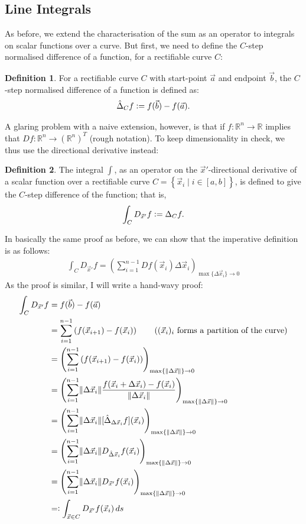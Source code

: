 \documentclass{article}
\newcommand{\vc}{\vcentcolon}
\theoremstyle{definition}
\newtheorem{defn}{Definition}[subsubsection]
\begin{document}
\subsection{Line Integrals}
As before, we extend the characterisation of the sum as an operator to integrals on scalar functions over a curve. But first, we need to define the $C$-step normalised difference of a function, for a rectifiable curve $C$:
\begin{defn}
	For a rectifiable curve $C$ with start-point $\vec a$ and endpoint $\vec b$, the $C$-step normalised difference of a function is defined as:
	\begin{align*}
		\hat{\Delta}_Cf\vc=f(\vec b)-f(\vec a).
	\end{align*}
\end{defn}
A glaring problem with a naive extension, however, is that if $f:\mathbb{R}^n\rightarrow \mathbb{R}$ implies that $Df:\mathbb{R}^n\rightarrow (\mathbb{R}^n)^T$ (rough notation). To keep dimensionality in check, we thus use the directional derivative instead:
\begin{defn}
	The integral $\int$, as an operator on the $\vec x'$-directional derivative of a scalar function over a rectifiable curve $C=\left\{\vec x_i\mid i\in[a,b]\right\}$, is defined to give the $C$-step difference of the function; that is,
	\begin{align*}
		\int_{C}D_{\vec x'}f\vc=\Delta_Cf.
	\end{align*}
\end{defn}
In basically the same proof as before, we can show that the imperative definition is as follows:
\begin{align*}
	\int_{C}D_{\vec x'}f=\left(\sum_{i=1}^{n-1}Df(\vec x_i)\Delta \vec x_i\right)_{\max\{\Delta \vec x_i\}\rightarrow0}
\end{align*}
As the proof is similar, I will write a hand-wavy proof:
\begin{align*}
	\int_{C}D_{\vec x'}f&=f(\vec b)-f(\vec a)\\
	&=\sum_{i=1}^{n-1}\left(f(\vec x_{i+1})-f(\vec x_i)\right)\tag*{($(\vec x_i)_i$ forms a partition of the curve)}\\
	&=\left(\sum_{i=1}^{n-1}\left(f(\vec x_{i+1})-f(\vec x_i)\right)\right)_{\max\{\left\lVert\Delta\vec x\right\rVert\}\rightarrow0}\\
	&=\left(\sum_{i=1}^{n-1}\lVert\Delta\vec x_i\rVert\frac{f(\vec x_{i}+\Delta\vec x_i)-f(\vec x_i)}{\lVert\Delta\vec x_i\rVert}\right)_{\max\{\left\lVert\Delta\vec x\right\rVert\}\rightarrow0}\\
	&=\left(\sum_{i=1}^{n-1}\lVert\Delta\vec x_i\rVert[\hat{\Delta}_{\Delta\vec x_i}f](\vec x_i)\right)_{\max\{\left\lVert\Delta\vec x\right\rVert\}\rightarrow0}\\
	&=\left(\sum_{i=1}^{n-1}\lVert\Delta\vec x_i\rVert D_{\hat{\Delta}\vec x_i}f(\vec x_i)\right)_{\max\{\left\lVert\Delta\vec x\right\rVert\}\rightarrow0}\\
	&=\left(\sum_{i=1}^{n-1}\lVert\Delta\vec x_i\rVert D_{\vec x'}f(\vec x_i)\right)_{\max\{\left\lVert\Delta\vec x\right\rVert\}\rightarrow0}\\
	&=\vc\int_{\vec x\in C}D_{\vec x'}f(\vec x_i)\,ds
\end{align*}
\end{document}
